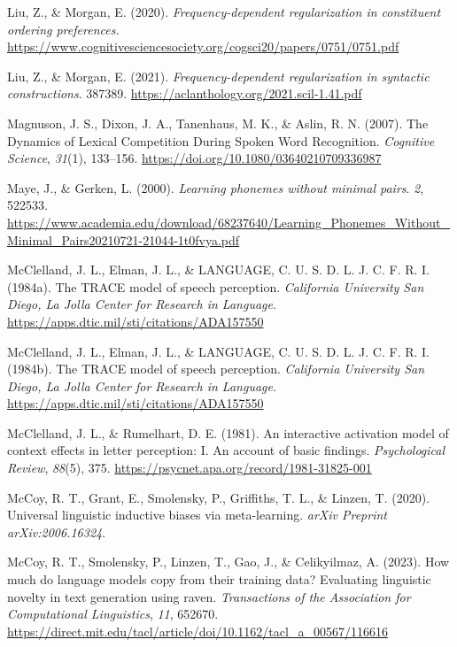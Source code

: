 \documentclass[
  12pt,
  letterpaper,
]{scrreport}
\newlength{\cslhangindent}
\newenvironment{CSLReferences}[2] %
 {\begin{list}{}{%
  \setlength{\itemindent}{0pt}
  \setlength{\leftmargin}{0pt}
  \setlength{\parsep}{0pt}
  \ifodd #1
   \setlength{\leftmargin}{\cslhangindent}
   \setlength{\itemindent}{-1\cslhangindent}
  \fi
  \setlength{\itemsep}{#2\baselineskip}}}
 {\end{list}}
\begin{document}
\begin{CSLReferences}{1}{0}
Liu, Z., \& Morgan, E. (2020). \emph{Frequency-dependent regularization
in constituent ordering preferences.}
\url{https://www.cognitivesciencesociety.org/cogsci20/papers/0751/0751.pdf}

Liu, Z., \& Morgan, E. (2021). \emph{Frequency-dependent regularization
in syntactic constructions}. 387389.
\url{https://aclanthology.org/2021.scil-1.41.pdf}

Magnuson, J. S., Dixon, J. A., Tanenhaus, M. K., \& Aslin, R. N. (2007).
The Dynamics of Lexical Competition During Spoken Word Recognition.
\emph{Cognitive Science}, \emph{31}(1), 133--156.
\url{https://doi.org/10.1080/03640210709336987}

Maye, J., \& Gerken, L. (2000). \emph{Learning phonemes without minimal
pairs}. \emph{2}, 522533.
\url{https://www.academia.edu/download/68237640/Learning_Phonemes_Without_Minimal_Pairs20210721-21044-1t0fvya.pdf}

McClelland, J. L., Elman, J. L., \& LANGUAGE, C. U. S. D. L. J. C. F. R.
I. (1984a). The TRACE model of speech perception. \emph{California
University San Diego, La Jolla Center for Research in Language}.
\url{https://apps.dtic.mil/sti/citations/ADA157550}

McClelland, J. L., Elman, J. L., \& LANGUAGE, C. U. S. D. L. J. C. F. R.
I. (1984b). The TRACE model of speech perception. \emph{California
University San Diego, La Jolla Center for Research in Language}.
\url{https://apps.dtic.mil/sti/citations/ADA157550}

McClelland, J. L., \& Rumelhart, D. E. (1981). An interactive activation
model of context effects in letter perception: I. An account of basic
findings. \emph{Psychological Review}, \emph{88}(5), 375.
\url{https://psycnet.apa.org/record/1981-31825-001}

McCoy, R. T., Grant, E., Smolensky, P., Griffiths, T. L., \& Linzen, T.
(2020). Universal linguistic inductive biases via meta-learning.
\emph{arXiv Preprint arXiv:2006.16324}.

McCoy, R. T., Smolensky, P., Linzen, T., Gao, J., \& Celikyilmaz, A.
(2023). How much do language models copy from their training data?
Evaluating linguistic novelty in text generation using raven.
\emph{Transactions of the Association for Computational Linguistics},
\emph{11}, 652670.
\url{https://direct.mit.edu/tacl/article/doi/10.1162/tacl_a_00567/116616}


\end{CSLReferences}
\end{document}
